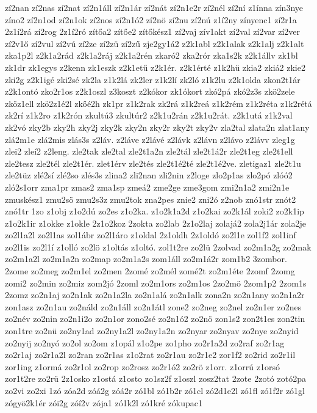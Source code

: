 {zí2nan
zí2nas
zí2nat
zí2n1áll
zí2n1ár
zí2nát
zí2n1e2r
zí2nél
zí2ní
z1ínna
zín3nye
zíno2
zí2n1od
zí2n1ok
zí2nos
zí2n1ó2
zí2nö
zí2nu
zí2nú
z1í2ny
zínyenc1
zí2r1a
2z1í2rá
zí2rog
2z1í2ró
zítőa2
zítőe2
zítőkész1
zí2vaj
zív1akt
zí2val
zí2var
zí2ver
zí2v1ő
zí2vul
zí2vú
zí2ze
zí2zü
zí2zű
zje2gy1á2
z2k1abl
z2k1alak
z2k1alj
z2k1alt
zka1p2l
z2k1a2rád
z2k1a2ráj
z2k1a2rén
zkaró2
zka2rór
zka1s2k
z2k1állv
zk1bl
zk1dr
zk1egys
z2kenn
zk1eszk
z2k1etű
z2k1ér.
z2k1érté
z1k2hü
zkia2
zkiá2
zkie2
zki2g
z2k1igé
zki2sé
zk2la
z1k2lá
zk2ler
z1k2lí
zk2ló
z1k2lu
z2k1olda
zkon2t1ár
z2k1ontó
zko2r1os
z2k1oszl
z3koszt
z2kókor
zk1ókort
zkó2pá
zkó2z3s
zkö2zele
zköz1ell
zkö2z1é2l
zkőé2h
zk1pr
z1k2rak
zk2rá
z1k2reá
z1k2rém
z1k2réta
z1k2rétá
zk2rí
z1k2ro
z1k2rón
zkultú3
zkultúr2
z2k1u2rán
z2k1u2rát.
z2k1utá
z1k2val
zk2vó
zky2b
zky2h
zky2j
zky2k
zky2n
zky2r
zky2t
zky2v
zla2tal
zlata2n
zlat1any
zlá2m1e
zlá2mis
zlás3s
z2láv.
z2láve
z2lávé
z2lávk
z2lávn
z2lávo
z2lávv
zleg1g
zlei2
zleí2
z2leng.
zle2tak
zle2tal
zle2t1a2n
zle2tál
zle2t1á2r
zle2t1eg
zle2t1ell
zle2tesz
zle2tél
zle2t1ér.
zlet1érv
zle2tés
zle2t1é2té
zle2t1é2ve.
zletigaz1
zle2t1u
zle2tüz
zlé2sí
zlé2so
zlés3s
zlina2
zli2nan
zli2nin
z2loge
zlo2p1as
zlo2pó
zlóó2
zló2s1orr
zma1pr
zmas2
zma1sp
zmeá2
zme2ge
zme3gom
zmi2n1a2
zmi2n1e
zmuskész1
zmu2sö
zmu2s3z
zmu2tok
zna2pes
znie2
zni2ó
z2nob
znó1str
znót2
znó1tr
1zo
z1obj
z1o2dú
zo2es
z1o2ka.
z1o2k1a2d
z1o2kai
zo2k1ál
zoki2
zo2k1ip
z1o2k1ir
z1okke
z1okle
2z1o2koz
2zokta
zo2lab
2z1o2laj
zolajá2
zola2j1ár
zola2je
zo2l1a2l
zo2l1as
zol1ábr
zo2l1áro
z1oldal
2z1oldh
2z1oldó
zo2l1e
zol1f2
zol1inf
zo2l1is
zo2l1í
z1olló
zo2lö
z1oltás
z1oltó.
zol1t2re
zo2lü
2zolvad
zo2m1a2g
zo2mak
zo2m1a2l
zo2m1a2n
zo2map
zo2m1a2s
zom1áll
zo2m1á2r
zom1b2
3zombor.
2zome
zo2meg
zo2m1el
zo2men
2zomé
zo2mél
zomé2t
zo2m1éte
2zomf
2zomg
zomi2
zo2min
zo2miz
zom2jó
2zoml
zo2m1ors
zo2m1os
2zo2mö
2zom1p2
2zom1s
2zomz
zo2n1aj
zo2n1ak
zo2n1a2la
zo2n1alá
zo2n1alk
zona2n
zo2n1any
zo2n1a2r
zon1asz
zo2n1au
zo2náld
zo2n1áll
zo2n1átl
zone2
zo2neg
zo2nel
zo2n1er
zo2nes
zo2név
zo2nin
zo2n1i2o
zo2n1or
zono2sé
zo2n1ó2
zo2nö
zon1s2
zon2t1es
zon2tin
zon1tre
zo2nü
zo2ny1ad
zo2ny1a2l
zo2ny1a2n
zo2nyar
zo2nyav
zo2nye
zo2nyid
zo2nyij
zo2nyó
zo2ol
zo2om
z1opál
z1o2pe
zo1pho
zo2r1a2d
zo2raf
zo2r1ag
zo2r1aj
zo2r1a2l
zo2ran
zo2r1as
z1o2rat
zo2r1au
zo2r1e2
zor1f2
zo2rid
zo2r1il
zor1ing
z1ormá
zo2r1ol
zo2rop
zo2rosz
zo2r1ó2
zo2rö
z1orr.
z1orrú
z1orsó
zor1t2re
zo2rü
2z1osko
z1ostá
z1osto
zo1sz2f
z1oszl
zosz2tat
2zote
2zotó
zotó2pa
zo2vi
zo2xi
1zó
zóa2d
zóá2g
zóá2r
zó1bl
zó1b2r
zó1cl
zó2d1e2l
zó1fl
zó1f2r
zó1gl
zógyö2k1ér
zói2g
zóí2v
zója1
zó1k2l
zó1kré
zókupac1
}
